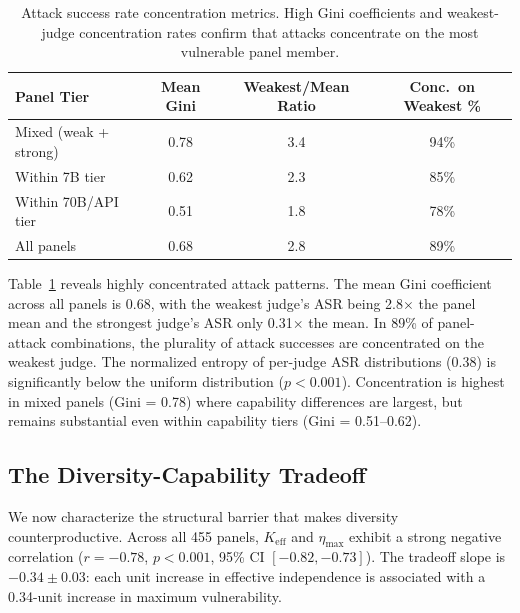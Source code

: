 \documentclass[11pt]{article}
\begin{document}
\begin{table}[t]
\centering
\caption{Attack success rate concentration metrics. High Gini coefficients and weakest-judge concentration rates confirm that attacks concentrate on the most vulnerable panel member.}
\label{tab:concentration}
\small
\begin{tabular}{lccc}
\toprule
\textbf{Panel Tier} & \textbf{Mean Gini} & \textbf{Weakest/Mean Ratio} & \textbf{Conc.\ on Weakest \%} \\
\midrule
Mixed (weak + strong) & 0.78 & 3.4 & 94\% \\
Within 7B tier         & 0.62 & 2.3 & 85\% \\
Within 70B/API tier    & 0.51 & 1.8 & 78\% \\
\midrule
All panels             & 0.68 & 2.8 & 89\% \\
\bottomrule
\end{tabular}
\end{table}

Table~\ref{tab:concentration} reveals highly concentrated attack patterns. The mean Gini coefficient across all panels is 0.68, with the weakest judge's ASR being 2.8$\times$ the panel mean and the strongest judge's ASR only 0.31$\times$ the mean. In 89\% of panel-attack combinations, the plurality of attack successes are concentrated on the weakest judge. The normalized entropy of per-judge ASR distributions (0.38) is significantly below the uniform distribution ($p < 0.001$). Concentration is highest in mixed panels (Gini = 0.78) where capability differences are largest, but remains substantial even within capability tiers (Gini = 0.51--0.62).

\subsection{The Diversity-Capability Tradeoff}
\label{sec:tradeoff}

We now characterize the structural barrier that makes diversity counterproductive. Across all 455 panels, $K_{\text{eff}}$ and $\eta_{\max}$ exhibit a strong negative correlation ($r = -0.78$, $p < 0.001$, 95\% CI $[-0.82, -0.73]$). The tradeoff slope is $-0.34 \pm 0.03$: each unit increase in effective independence is associated with a 0.34-unit increase in maximum vulnerability.
\end{document}
